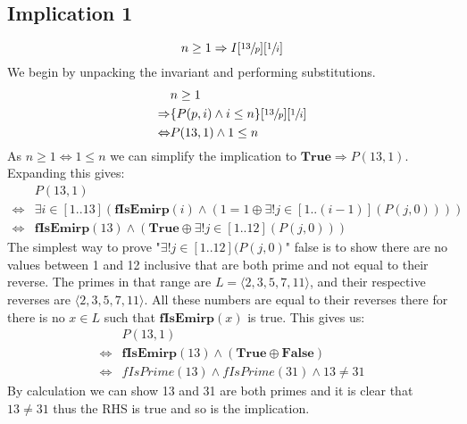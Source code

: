 \documentclass[a4paper]{article}
\begin{document}
\subsection{Implication 1}
$$ n \geq 1 \Rightarrow I[\sfrac{13}{p}][\sfrac{1}{i}] $$
\noindent
We begin by unpacking the invariant and performing substitutions.
\begin{align*}
		&	n \geq 1 \\
		\Rightarrow & \{P(p, i) \land i \leq n\}[\sfrac{13}{p}][\sfrac{1}{i}] \\
		\Leftrightarrow & P(13, 1) \land 1 \leq n
\end{align*}
\noindent
As $n \geq 1 \Leftrightarrow 1 \leq n$ we can simplify the implication to $\textbf{True} \Rightarrow P(13, 1)$. Expanding this gives:
\begin{align*}
		& 	P(13, 1) \\
		\Leftrightarrow 	&	\exists i \in [1..13](\textbf{fIsEmirp}(i) \land ( 1 = 1 \oplus \exists! j \in [1..(i-1)](P(j, 0)))) \\
		\Leftrightarrow		&	\textbf{fIsEmirp}(13) \land (\textbf{True} \oplus \exists! j \in [1..12](P(j, 0)))
\end{align*}
\noindent
The simplest way to prove "$\exists! j \in [1..12](P(j, 0)$" false is to show there are no values between 1 and 12 inclusive that are both prime and not equal to their reverse. The primes in that range are $L = \langle 2, 3, 5, 7, 11 \rangle$, and their respective reverses are $\langle2, 3, 5, 7, 11\rangle$. All these numbers are equal to their reverses there for there is no $x \in L$ such that $\textbf{fIsEmirp}(x)$ is true.
This gives us:
\begin{align*}
		&	P(13, 1) \\
		\Leftrightarrow & \textbf{fIsEmirp}(13) \land (\textbf{True} \oplus \textbf{False}) \\
		\Leftrightarrow		&	fIsPrime(13) \land fIsPrime(31) \land 13 \neq 31
\end{align*}
\noindent
By calculation we can show 13 and 31 are both primes and it is clear that $13 \neq 31$ thus the RHS is true and so is the implication. 
\end{document}
